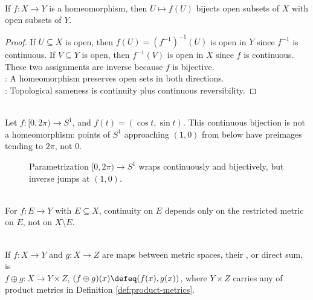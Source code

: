 \begin{proposition} \label{prop:homeomorphisms-preserve-topology} \\
If $f:X\to Y$ is a homeomorphism, then $U\mapsto f(U)$ bijects open subsets of $X$ with open subsets of $Y$.
\begin{proof}
If $U\subseteq X$ is open, then $f(U)=(f^{-1})^{-1}(U)$ is open in $Y$ since $f^{-1}$ is continuous. If $V\subseteq Y$ is open, then $f^{-1}(V)$ is open in $X$ since $f$ is continuous. These two assignments are inverse because $f$ is bijective.\\
: A homeomorphism preserves open sets in both directions.\\
: Topological sameness is continuity plus continuous reversibility.
\end{proof}
\end{proposition}

\begin{example} \label{ex:circle-param-continuous-bijection-not-homeomorphism} \\
Let $f:[0,2\pi)\to S^1$, and $f(t)=(\cos t,\sin t)$. This continuous bijection is not a homeomorphism: points of $S^1$ approaching $(1,0)$ from below have preimages tending to $2\pi$, not $0$.
\end{example}

\begin{figure}[htbp]
  \centering
  
  \caption{Parametrization $[0,2\pi)\to S^1$ wraps continuously and bijectively, but inverse jumps at $(1,0)$.}
  \label{fig:circle-interval-wrap-not-homeomorphism}
\end{figure}

\begin{remark} \label{rem:continuity-domain-only} \\
For $f:E\to Y$ with $E\subseteq X$, continuity on $E$ depends only on the restricted metric on $E$, not on $X\setminus E$.
\end{remark}

\begin{definition} \label{def:product-map-direct-sum} \\
If $f:X\to Y$ and $g:X\to Z$ are maps between metric spaces, their , or direct sum, is\\
$f\oplus g:X\to Y\times Z$, $(f\oplus g)(x)\defeq(f(x),g(x))$, where $Y\times Z$ carries any of product metrics in Definition \ref{def:product-metrics}.
\end{definition}


